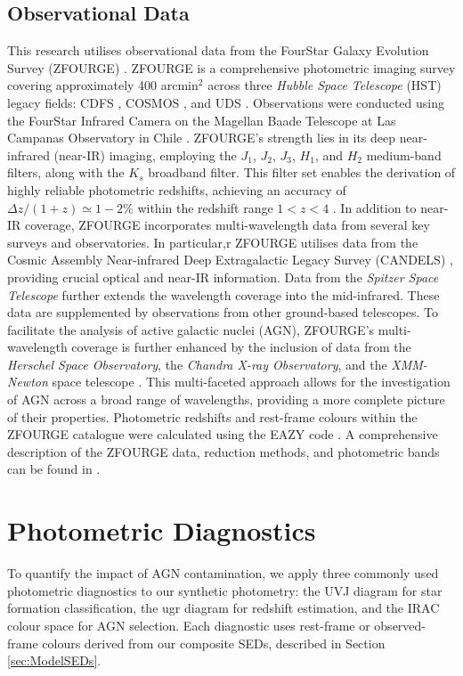 \documentclass[
  journal=pasa,
  manuscript=research-paper,
  year=202X,
  volume=YY,
]{cup-journal}
\begin{document}
\subsection{Observational Data}
This research utilises observational data from the FourStar Galaxy Evolution Survey (ZFOURGE) \citep{straatman_fourstar_2016}. ZFOURGE is a comprehensive photometric imaging survey covering approximately 400 arcmin$^2$ across three \textit{Hubble Space Telescope} (HST) legacy fields: CDFS \citep{giacconi_chandra_2002}, COSMOS \citep{scoville_cosmic_2007}, and UDS \citep{lawrence_ukirt_2007}. Observations were conducted using the FourStar Infrared Camera on the Magellan Baade Telescope at Las Campanas Observatory in Chile \citep{persson_fourstar_2013}. ZFOURGE's strength lies in its deep near-infrared (near-IR) imaging, employing the $J_1$, $J_2$, $J_3$, $H_1$, and $H_2$ medium-band filters, along with the $K_s$ broadband filter. This filter set enables the derivation of highly reliable photometric redshifts, achieving an accuracy of $\Delta z/(1+z) \simeq 1-2\%$ within the redshift range $1 < z < 4$ \citep{straatman_fourstar_2016}. In addition to near-IR coverage, ZFOURGE incorporates multi-wavelength data from several key surveys and observatories. In particular,r ZFOURGE utilises data from the Cosmic Assembly Near-infrared Deep Extragalactic Legacy Survey (CANDELS) \citep{koekemoer_candels_2011, grogin_candels_2011, skelton_3d-hst_2014}, providing crucial optical and near-IR information. Data from the \textit{Spitzer Space Telescope} \citep{fazio_infrared_2004, rieke_multiband_2004} further extends the wavelength coverage into the mid-infrared. These data are supplemented by observations from other ground-based telescopes. To facilitate the analysis of active galactic nuclei (AGN), ZFOURGE's multi-wavelength coverage is further enhanced by the inclusion of data from the \textit{Herschel Space Observatory}, the \textit{Chandra X-ray Observatory}, and the \textit{XMM-Newton} space telescope \citep{cowley_zfourge_2016, padovani_active_2017}. This multi-faceted approach allows for the investigation of AGN across a broad range of wavelengths, providing a more complete picture of their properties. Photometric redshifts and rest-frame colours within the ZFOURGE catalogue were calculated using the EAZY code \citep{brammer_eazy_2008}. A comprehensive description of the ZFOURGE data, reduction methods, and photometric bands can be found in \citet{straatman_fourstar_2016}.

\section{Photometric Diagnostics} %
\label{sec:PhotometricDiagnostics}
To quantify the impact of AGN contamination, we apply three commonly used photometric diagnostics to our synthetic photometry: the UVJ diagram for star formation classification, the ugr diagram for redshift estimation, and the IRAC colour space for AGN selection. Each diagnostic uses rest-frame or observed-frame colours derived from our composite SEDs, described in Section \ref{sec:ModelSEDs}.
\end{document}
